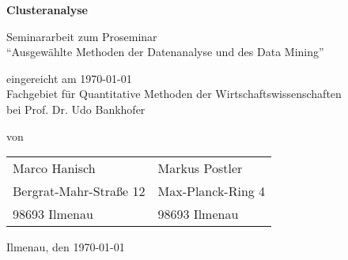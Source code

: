 \begin{titlepage}

\begin{center}
\vspace{1cm}
\large{\textbf{Clusteranalyse}}

\vspace{2cm}

\large{Seminararbeit zum Proseminar} \\ 
``Ausgewählte Methoden der Datenanalyse und des Data Mining'' \\

\vspace{3cm}

eingereicht am \today \\
Fachgebiet für Quantitative Methoden der Wirtschaftswissenschaften \\
bei Prof. Dr. Udo Bankhofer \\

\vspace{4cm}

von \\
\vspace{1cm}
\begin{tabular}{l|l}
   Marco Hanisch & Markus Postler \\ 
   Bergrat-Mahr-Straße 12 & Max-Planck-Ring 4 \\ 
   98693 Ilmenau & 98693 Ilmenau \\ 
 \end{tabular}

\vspace{5cm}

Ilmenau, den \today
\end{center}

\end{titlepage}
